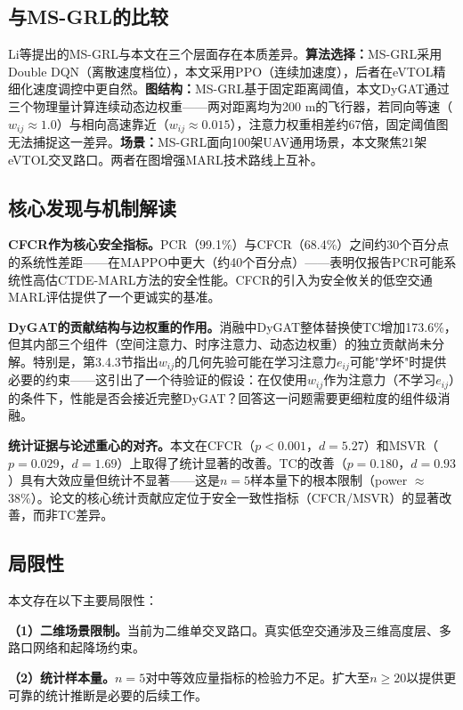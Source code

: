 \documentclass[12pt,a4paper,UTF8]{ctexart}
\begin{document}
\subsection{与MS-GRL的比较}

Li等\cite{ref10}提出的MS-GRL与本文在三个层面存在本质差异。\textbf{算法选择：}MS-GRL采用Double DQN（离散速度档位），本文采用PPO（连续加速度），后者在eVTOL精细化速度调控中更自然。\textbf{图结构：}MS-GRL基于固定距离阈值，本文DyGAT通过三个物理量计算连续动态边权重——两对距离均为200 m的飞行器，若同向等速（$w_{ij}\approx1.0$）与相向高速靠近（$w_{ij}\approx0.015$），注意力权重相差约67倍，固定阈值图无法捕捉这一差异。\textbf{场景：}MS-GRL面向100架UAV通用场景，本文聚焦21架eVTOL交叉路口。两者在图增强MARL技术路线上互补。

\subsection{核心发现与机制解读}

\textbf{CFCR作为核心安全指标。}PCR（99.1\%）与CFCR（68.4\%）之间约30个百分点的系统性差距——在MAPPO中更大（约40个百分点）——表明仅报告PCR可能系统性高估CTDE-MARL方法的安全性能。CFCR的引入为安全攸关的低空交通MARL评估提供了一个更诚实的基准。

\textbf{DyGAT的贡献结构与边权重的作用。}消融中DyGAT整体替换使TC增加173.6\%，但其内部三个组件（空间注意力、时序注意力、动态边权重）的独立贡献尚未分解。特别是，第3.4.3节指出$w_{ij}$的几何先验可能在学习注意力$e_{ij}$可能"学坏"时提供必要的约束——这引出了一个待验证的假设：在仅使用$w_{ij}$作为注意力（不学习$e_{ij}$）的条件下，性能是否会接近完整DyGAT？回答这一问题需要更细粒度的组件级消融。

\textbf{统计证据与论述重心的对齐。}本文在CFCR（$p<0.001$，$d=5.27$）和MSVR（$p=0.029$，$d=1.69$）上取得了统计显著的改善。TC的改善（$p=0.180$，$d=0.93$）具有大效应量但统计不显著——这是$n=5$样本量下的根本限制（power $\approx$38\%）。论文的核心统计贡献应定位于安全一致性指标（CFCR/MSVR）的显著改善，而非TC差异。

\subsection{局限性}

本文存在以下主要局限性：

\textbf{（1）二维场景限制。}当前为二维单交叉路口。真实低空交通涉及三维高度层、多路口网络和起降场约束。

\textbf{（2）统计样本量。}$n=5$对中等效应量指标的检验力不足。扩大至$n\geq20$以提供更可靠的统计推断是必要的后续工作。
\end{document}
